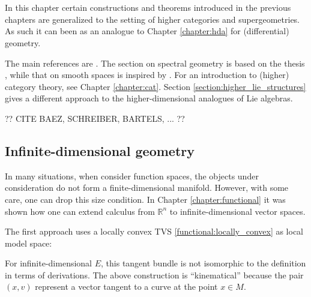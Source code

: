 \chapter{}\label{chapter:hdg}

    In this chapter certain constructions and theorems introduced in the previous chapters are generalized to the setting of higher categories and supergeometries. As such it can been as an analogue to Chapter \ref{chapter:hda} for (differential) geometry.

    The main references are \cite{higher_gauge, phd_schreiber}. The section on spectral geometry is based on the thesis \cite{spectral_geometry}, while that on smooth spaces is inspired by \cite{baez_convenient}. For an introduction to (higher) category theory, see Chapter \ref{chapter:cat}. Section \ref{section:higher_lie_structures} gives a different approach to the higher-dimensional analogues of Lie algebras.

    ?? CITE BAEZ, SCHREIBER, BARTELS, ... ??

\section{Infinite-dimensional geometry}\label{section:infinie_dimensional}

    In many situations, when consider function spaces, the objects under consideration do not form a finite-dimensional manifold. However, with some care, one can drop this size condition. In Chapter \ref{chapter:functional} it was shown how one can extend calculus from $\mathbb{R}^n$ to infinite-dimensional vector spaces.

    The first approach uses a locally convex TVS \ref{functional:locally_convex} as local model space:

    \begin{remark}
        For infinite-dimensional $E$, this tangent bundle is not isomorphic to the definition in terms of derivations. The above construction is ``kinematical'' because the pair $(x,v)$ represent a vector tangent to a curve at the point $x\in M$.
    \end{remark}

